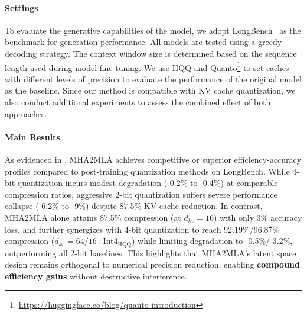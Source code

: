 \paragraph{Settings}
To evaluate the generative capabilities of the model, we adopt LongBench~\cite{acl/BaiLZL0HDLZHDTL24} as the benchmark for generation performance. All models are tested using a greedy decoding strategy. The context window size is determined based on the sequence length used during model fine-tuning. We use HQQ \cite{badri2023hqq} and Quanto\footnote{\url{https://huggingface.co/blog/quanto-introduction}} to set caches with different levels of precision to evaluate the performance of the original model as the baseline. Since our method is compatible with KV cache quantization, we also conduct additional experiments to assess the combined effect of both approaches.

\paragraph{Main Results}
As evidenced in , MHA2MLA achieves competitive or superior efficiency-accuracy profiles compared to post-training quantization methods on LongBench. While 4-bit quantization incurs modest degradation (-0.2\% to -0.4\%) at comparable compression ratios, aggressive 2-bit quantization suffers severe performance collapse (-6.2\% to -9\%) despite 87.5\% KV cache reduction. In contrast, MHA2MLA alone attains 87.5\% compression (at \( d_{kv}\!=\!16 \)) with only 3\% accuracy loss, and further synergizes with 4-bit quantization to reach 92.19\%/96.87\% compression (\( d_{kv}\!=\!64/16 \)+Int4$_\text{HQQ}$) while limiting degradation to -0.5\%/-3.2\%, outperforming all 2-bit baselines. This highlights that MHA2MLA's latent space design remains orthogonal to numerical precision reduction, enabling \textbf{compound efficiency gains} without destructive interference.  



